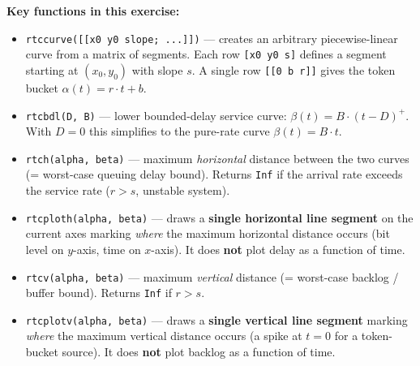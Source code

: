 \documentclass[12pt, a4paper]{article}
\begin{document}
\begin{defbox}
  \textbf{Key functions in this exercise:}
  \begin{itemize}[leftmargin=1.2em, itemsep=4pt]
    \item \texttt{rtccurve([[x0\ y0\ slope; ...]])} --- creates an
      arbitrary piecewise-linear curve from a matrix of segments.
      Each row \texttt{[x0 y0 s]} defines a segment starting at
      $(x_0, y_0)$ with slope $s$.
      A single row \texttt{[[0 b r]]} gives the token bucket
      $\alpha(t) = r \cdot t + b$.

    \item \texttt{rtcbdl(D, B)} --- lower bounded-delay service curve:
      $\beta(t) = B \cdot (t - D)^+$.
      With $D=0$ this simplifies to the pure-rate curve $\beta(t) = B \cdot t$.

    \item \texttt{rtch(alpha, beta)} --- maximum \emph{horizontal} distance
      between the two curves (= worst-case queuing delay bound).
      Returns \texttt{Inf} if the arrival rate exceeds the service rate
      ($r > s$, unstable system).

    \item \texttt{rtcploth(alpha, beta)} --- draws a \textbf{single horizontal
      line segment} on the current axes marking \emph{where} the maximum
      horizontal distance occurs (bit level on $y$-axis, time on $x$-axis).
      It does \textbf{not} plot delay as a function of time.

    \item \texttt{rtcv(alpha, beta)} --- maximum \emph{vertical} distance
      (= worst-case backlog / buffer bound).
      Returns \texttt{Inf} if $r > s$.

    \item \texttt{rtcplotv(alpha, beta)} --- draws a \textbf{single vertical
      line segment} marking \emph{where} the maximum vertical distance occurs
      (a spike at $t = 0$ for a token-bucket source).
      It does \textbf{not} plot backlog as a function of time.
  \end{itemize}
\end{defbox}
\end{document}
